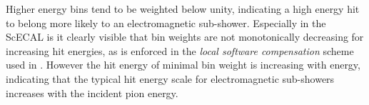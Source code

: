 \documentclass[twoside,a4paper,12pt]{article}
\begin{document}
Higher energy bins tend to be weighted below unity, indicating a high energy hit to belong more likely to an electromagnetic sub-shower. Especially in the ScECAL is it clearly visible that bin weights are not monotonically decreasing for increasing hit energies, as is enforced in the \emph{local software compensation} scheme used in \cite{SCPaper}. However the hit energy of minimal bin weight is increasing with energy, indicating that the typical hit energy scale for electromagnetic sub-showers increases with the incident pion energy.
\begin{figure}[htbp]
	\hfill
	\hfill
	

\end{figure}
\end{document}
